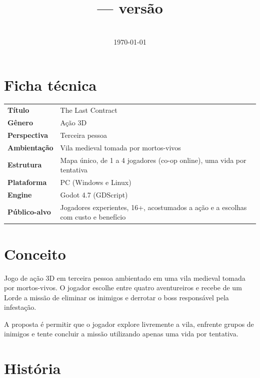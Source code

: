\documentclass[11pt,a4paper]{article}
\title{\textbf{\jogo} \\ \large \subtitulo{} --- versão \gddversao}
\author{\equipe}
\date{\disciplina \\ \today}
\newcommand{\jogo}{The Last Contract}
\begin{document}
\maketitle
\thispagestyle{empty}
\tableofcontents
\newpage

\section{Ficha técnica}

\begin{tabularx}{\textwidth}{@{}lX@{}}
\toprule
\textbf{Título}          & \jogo \\
\textbf{Gênero}          & Ação 3D \\
\textbf{Perspectiva}     & Terceira pessoa \\
\textbf{Ambientação}     & Vila medieval tomada por mortos-vivos \\
\textbf{Estrutura}       & Mapa único, de 1 a 4 jogadores (co-op online), uma vida por tentativa \\
\textbf{Plataforma}      & PC (Windows e Linux) \\
\textbf{Engine}          & Godot 4.7 (GDScript) \\
\textbf{Público-alvo}    & Jogadores experientes, 16+, acostumados a ação e a escolhas com custo e benefício \\
\bottomrule
\end{tabularx}

\section{Conceito}

Jogo de ação 3D em terceira pessoa ambientado em uma vila medieval tomada por mortos-vivos. O jogador escolhe entre quatro aventureiros e recebe de um Lorde a missão de eliminar os inimigos e derrotar o boss responsável pela infestação.

A proposta é permitir que o jogador explore livremente a vila, enfrente grupos de inimigos e tente concluir a missão utilizando apenas uma vida por tentativa.

\section{História}
\end{document}
